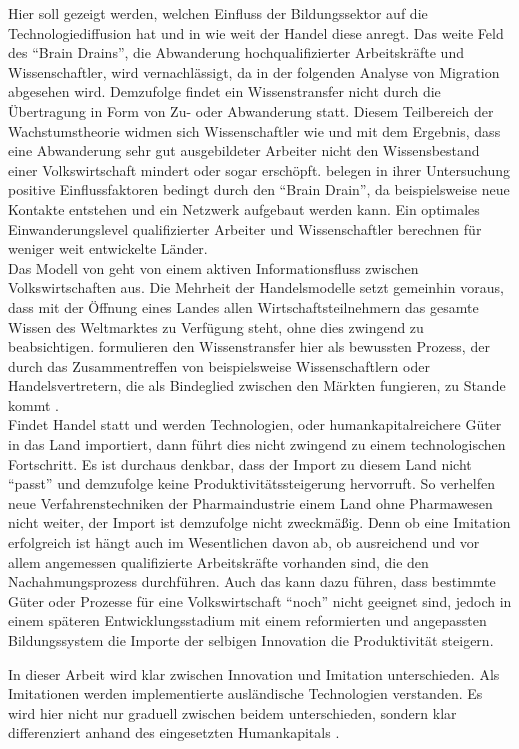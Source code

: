 Hier soll gezeigt werden, welchen Einfluss der Bildungssektor auf die Technologiediffusion hat und in wie weit der Handel diese anregt.
Das weite Feld des "`Brain Drains"', die Abwanderung hochqualifizierter Arbeitskr{\"a}fte und Wissenschaftler, wird vernachl{\"a}ssigt, da in der folgenden Analyse von Migration abgesehen wird. Demzufolge findet ein Wissenstransfer nicht durch die {\"U}bertragung in Form von Zu- oder Abwanderung statt. Diesem Teilbereich der Wachstumstheorie widmen sich  Wissenschaftler wie \citet{Agrawal.2011,Docquier.Sept} und \citet{ONeil.WashingtonDC} mit dem Ergebnis, dass eine Abwanderung sehr gut ausgebildeter Arbeiter nicht den Wissensbestand einer Volkswirtschaft mindert oder sogar ersch{\"o}pft.  \citet{Docquier.Sept}  belegen in ihrer Untersuchung positive Einflussfaktoren bedingt durch den "`Brain Drain"', da beispielsweise neue Kontakte entstehen und ein Netzwerk aufgebaut werden kann. Ein optimales Einwanderungslevel qualifizierter Arbeiter und Wissenschaftler berechnen \citet{Docquier.Sept} f{\"u}r weniger weit entwickelte L{\"a}nder.\\
Das Modell von \citet{Grossman.1990c} geht von einem aktiven Informationsfluss zwischen Volkswirtschaften aus. Die Mehrheit der Handelsmodelle setzt gemeinhin voraus, dass mit der {\"O}ffnung eines Landes allen Wirtschaftsteilnehmern das gesamte Wissen des Weltmarktes zu Verf{\"u}gung steht, ohne dies zwingend zu beabsichtigen. \citet{Grossman.1990c} formulieren den Wissenstransfer hier als bewussten Prozess, der durch das Zusammentreffen von beispielsweise Wissenschaftlern oder Handelsvertretern, die als Bindeglied zwischen den M{\"a}rkten fungieren, zu Stande kommt \citep{Grossman.1990c}.\\


Findet Handel statt und werden Technologien, oder humankapitalreichere G{\"u}ter in das Land importiert, dann f{\"u}hrt dies nicht zwingend zu einem technologischen Fortschritt. Es ist durchaus denkbar, dass der Import zu diesem Land nicht "`passt"' und demzufolge keine Produktivit{\"a}tssteigerung hervorruft. So verhelfen neue Verfahrenstechniken der Pharmaindustrie einem Land ohne Pharmawesen nicht weiter, der Import ist demzufolge nicht zweckm{\"a}{\ss}ig. Denn ob eine Imitation erfolgreich ist h{\"a}ngt auch im Wesentlichen davon ab, ob ausreichend und vor allem angemessen qualifizierte Arbeitskr{\"a}fte vorhanden sind, die den Nachahmungsprozess durchf{\"u}hren. Auch das kann dazu f{\"u}hren, dass bestimmte G{\"u}ter oder Prozesse f{\"u}r eine Volkswirtschaft "`noch"' nicht geeignet sind, jedoch in einem sp{\"a}teren Entwicklungsstadium mit einem reformierten und angepassten Bildungssystem die Importe der selbigen Innovation die Produktivit{\"a}t steigern.
\bigskip

In dieser Arbeit wird klar zwischen Innovation und Imitation unterschieden. Als Imitationen werden implementierte ausl{\"a}ndische Technologien verstanden. Es wird hier nicht nur graduell zwischen beidem unterschieden, sondern klar differenziert anhand des eingesetzten Humankapitals \citep{Cohen.1989,Griffith.2004}.
